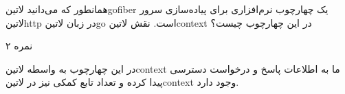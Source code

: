 
همانطور که می‌دانید ‌لاتین{gofiber} یک چهارچوب نرم‌افزاری برای پیاده‌سازی سرور ‌لاتین{http} در زبان ‌لاتین{go} است.
نقش ‌لاتین{context} در این چهارچوب چیست؟

۲ نمره


در این چهارچوب به واسطه ‌لاتین{context} ما به اطلاعات پاسخ و درخواست دسترسی پیدا کرده و تعداد تابع کمکی نیز در ‌لاتین{context} وجود دارد.

